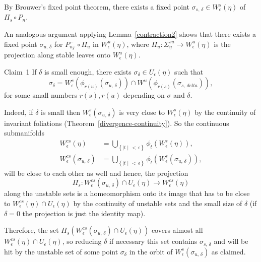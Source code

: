\documentclass[10pt]{amsart}
\theoremstyle{definition}
\begin{document}
By Brouwer's fixed point theorem, there exists a fixed point $\sigma_{s,\,\delta} \in W^{s}_{\epsilon}(\eta)$ of $\Pi_{s} \circ P_{n}$.

An analogous argument applying Lemma~\ref{contraction2} shows that there exists a fixed point $\sigma_{u,\,\delta}$ for $P_{n_{\delta}^{-}}^{-}\circ \Pi_{u}$ in $W^{u}_{\epsilon}(\eta)$, where $\Pi_{u} : \Sigma_{\eta}^{su} \longrightarrow W^{u}_{\epsilon}(\eta)$ is the projection along stable leaves onto $W^{u}_{\epsilon}(\eta)$.

\begin{enonce*}[plain]{Claim~1} If $\delta$ is small enough, there exists $\sigma_{\delta} \in U_{\epsilon}(\eta)$ such that
\[
\sigma_{\delta} = W^{s}_{\epsilon}\left(\phi_{r(u)}(\sigma_{u, \,\delta})\right)\cap W^{u}\left(\phi_{r(s)}(\sigma_{s,\,delta})\right),
\]
for some small numbers $r(s), r(u)$ depending on $\sigma$ and $\delta$.
\end{enonce*}

Indeed, if $\delta $ is small then $W^{s}_{\epsilon}(\sigma_{u, \,\delta})$ is very close to $W^{s}_{\epsilon}(\eta)$ by the continuity of invariant foliations (Theorem~\ref{divergence-continuity}). So the continuous submanifolds
\begin{align*}
W^{cs}_{\epsilon}(\eta) &= \bigcup_{\left\{\mid t \mid\,<\,\epsilon\right\}} \phi_{t}\left(W^{s}_{\epsilon}(\eta)\right),
\\
W^{cs}_{\epsilon}(\sigma_{u,\,\delta}) &= \bigcup_{\left\{\mid t \mid\,<\,\epsilon\right\}} \phi_{t}\left(W^{s}_{\epsilon}(\sigma_{u,\,\delta})\right),
\end{align*}
will be close to each other as well and hence, the projection
\[
\Pi_{s} : W^{cs}_{\epsilon}(\sigma_{u,\,\delta}) \cap U_{\epsilon}(\eta) \longrightarrow W^{cs}_{\epsilon}(\eta)
\]
along the unstable sets is a homeomorphism onto its image that has to be close to $W^{cs}_{\epsilon}(\eta) \cap U_{\epsilon}(\eta)$ by the continuity of unstable sets and the small size of $\delta$ (if $\delta =0$ the projection is just the identity map).

Therefore, the set $\Pi_{s}(W^{cs}_{\epsilon}(\sigma_{u,\,\delta})\cap U_{\epsilon}(\eta)) $ covers almost all $W^{cs}_{\epsilon}(\eta) \cap U_{\epsilon}(\eta) $, so reducing $\delta$ if necessary this set contains $\sigma_{s,\,\delta}$ and will be hit by the unstable set of some point $\sigma_{\delta}$ in the orbit of $W^{s}_{\epsilon}(\sigma_{u,\,\delta})$ as claimed.
\end{document}
